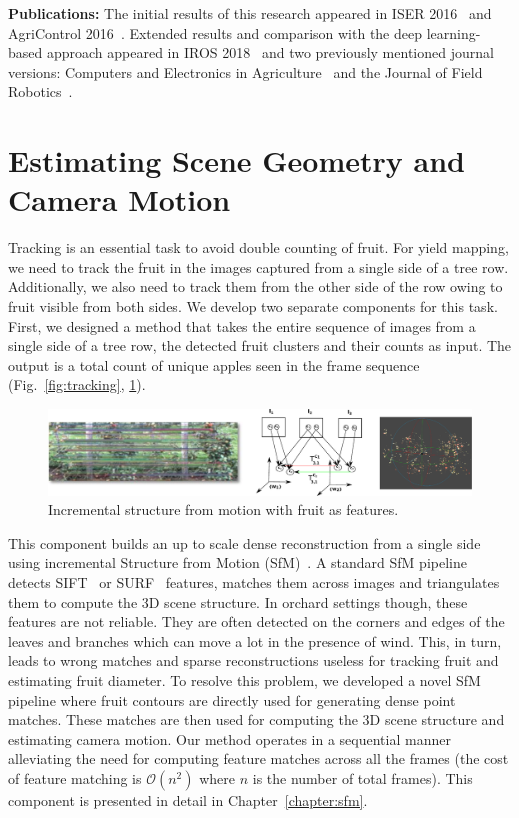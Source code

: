 \textbf{Publications:} The initial results of this research appeared in ISER 2016~\cite{roy2016counting} and AgriControl 2016~\cite{peng2016semantic}. Extended results and comparison with the deep learning-based approach appeared in IROS 2018~\cite{hani_apple_2018} and two previously mentioned journal versions: Computers and Electronics in Agriculture~\cite{roy2018arxiv} and the Journal of Field Robotics~\cite{hani_jfr_counting}. 



\section{Estimating Scene Geometry and Camera Motion}\label{subsec:syscammotion}

Tracking is an essential task to avoid double counting of fruit. For yield mapping, we need to track the fruit in the images captured from a single side of a tree row. Additionally, we also need to track them from the other side of the row owing to fruit visible from both sides. We develop two separate components for this task. First, we designed a method that takes the entire sequence of images from a single side of a tree row, the detected fruit clusters and their counts as input. The output is a total count of unique apples seen in the frame sequence (Fig.~\ref{fig:tracking}, \ref{fig:incsfm_intro}).

\begin{figure}[!hbpt]
    \centering
    \includegraphics[width=\textwidth]{figures/prelim/case.pdf}
    \caption[Incremental structure from motion with fruit as features.]{ Incremental structure from motion with fruit as features. }
    \label{fig:incsfm_intro}
\end{figure}

This component builds an up to scale dense reconstruction from a single side using incremental Structure from Motion (SfM)~\cite{sinha2014multi}. A standard SfM pipeline detects SIFT~\cite{surffeature} or SURF~\cite{sift} features, matches them across images and triangulates them to compute the 3D scene structure. In orchard settings though, these features are not reliable. They are often detected on the corners and edges of the leaves and branches which can move a lot in the presence of wind. This, in turn, leads to wrong matches and sparse reconstructions useless for tracking fruit and estimating fruit diameter. To resolve this problem, we developed a novel SfM pipeline where fruit contours are directly used for generating dense point matches. These matches are then used for computing the 3D scene structure and estimating camera motion. Our method operates in a sequential manner alleviating the need for computing feature matches across all the frames (the cost of feature matching is $\mathcal{O}(n^2)$ where $n$ is the number of total frames).  This component is presented in detail in Chapter~\ref{chapter:sfm}. \\

